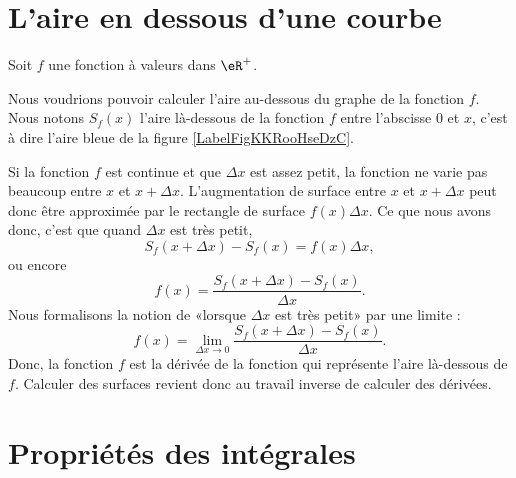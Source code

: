 
\section{L'aire en dessous d'une courbe}

Soit $f$ une fonction à valeurs dans $\eR^+$.

Nous voudrions pouvoir calculer l'aire au-dessous du graphe de la fonction \( f\). Nous notons $S_f(x)$ l'aire là-dessous de la fonction $f$ entre l'abscisse $0$ et $x$, c'est à dire l'aire bleue de la figure \ref{LabelFigKKRooHseDzC}. 

\newcommand{\CaptionFigKKRooHseDzC}{L'aire en dessous d'une courbe. Le rectangle rouge d'aire $f(x)\Delta x$ approxime de combien la surface augmente lorsqu'on passe de $x$ à $x+\Delta x$.}


Si la fonction $f$ est continue et que $\Delta x$ est assez petit, la fonction ne varie pas beaucoup entre $x$ et $x+\Delta x$. L'augmentation de surface entre $x$ et $x+\Delta x$ peut donc être approximée par le rectangle de surface $f(x)\Delta x$. Ce que nous avons donc, c'est que quand $\Delta x$ est très petit,
\begin{equation}
	S_f(x+\Delta x)-S_f(x)=f(x)\Delta x,
\end{equation}
ou encore
\begin{equation}
	f(x)=\frac{  S_f(x+\Delta x)-S_f(x)}{ \Delta x }.
\end{equation}
Nous formalisons la notion de «lorsque \( \Delta x\) est très petit» par une limite :
\begin{equation}
	f(x)=\lim_{\Delta x\to 0}\frac{  S_f(x+\Delta x)-S_f(x)}{ \Delta x }.
\end{equation}
Donc, la fonction $f$ est la dérivée de la fonction qui représente l'aire là-dessous de $f$. Calculer des surfaces revient donc au travail inverse de calculer des dérivées.


\section{Propriétés des intégrales}

